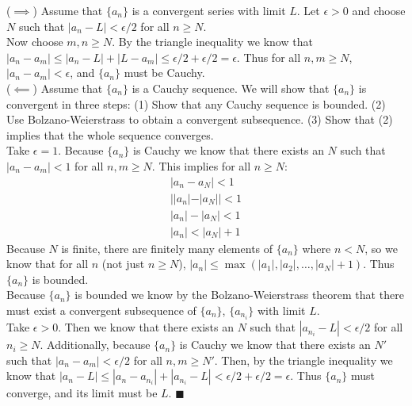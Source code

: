 \documentclass[12pt]{article}
\begin{document}
    \pf ($\implies$) Assume that $\{a_n\}$ is a convergent series with limit $L$. Let $\epsilon > 0$ and
    choose $N$ such that $|a_n - L| < \epsilon/2$ for all $n \geq N$.\\

    Now choose $m,n \geq N$. By the triangle inequality we know that $|a_n - a_m| \leq |a_n - L| + |L - a_m| 
    \leq \epsilon/2 + \epsilon/2 = \epsilon$. Thus for all $n, m\geq N$, $|a_n - a_m| < \epsilon$, and 
    $\{a_n\}$ must be Cauchy.\\

    ($\impliedby$) Assume that $\{a_n\}$ is a Cauchy sequence. We will show that $\{a_n\}$ is convergent
    in three steps: (1) Show that any Cauchy sequence is bounded. (2) Use Bolzano-Weierstrass to obtain
    a convergent subsequence. (3) Show that (2) implies that the whole sequence converges.\\

    Take $\epsilon = 1$. Because $\{a_n\}$ is Cauchy we know that there exists an $N$ such that 
    $|a_n - a_m| < 1$ for all $n, m \geq N$. This implies for all $n \geq N$:
    \begin{align*}
      |a_n - a_N| < 1\\
      ||a_n| - |a_N|| < 1\\
      |a_n| - |a_N| < 1\\
      |a_n| <  |a_N| + 1
    \end{align*}
    Because $N$ is finite, there are finitely many elements of $\{a_n\}$ where $n < N$, so we know that for all
    $n$ (not just $n \geq N$), $|a_n| \leq \max(|a_1|,|a_2|,\ldots,|a_N|+1)$. Thus $\{a_n\}$ is bounded.\\

    Because $\{a_n\}$ is bounded we know by the Bolzano-Weierstrass theorem that there must exist 
    a convergent subsequence of $\{a_n\}$, $\{a_{n_i}\}$ with limit $L$.\\

    Take $\epsilon > 0$. Then we know that there exists an $N$ such that $|a_{n_i} - L| < \epsilon/2$
    for all $n_i \geq N$. Additionally, because $\{a_n\}$ is Cauchy we know that there exists an $N'$
    such that $|a_n - a_m| < \epsilon/2$ for all $n,m \geq N'$. Then, by the triangle inequality we know
    that $|a_n - L| \leq |a_n - a_{n_i}| + |a_{n_i} - L| < \epsilon/2 + \epsilon/2 = \epsilon$. Thus
    $\{a_n\}$ must converge, and its limit must be $L$. $\blacksquare$
\end{document}
